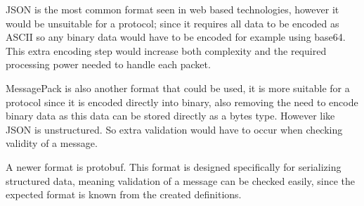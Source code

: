 JSON is the most common format seen in web based technologies, however it would be unsuitable for a protocol; since it requires all data to be encoded as ASCII so any binary data would have to be encoded for example using base64. This extra encoding step would increase both complexity and the required processing power needed to handle each packet.

MessagePack is also another format that could be used, it is more suitable for a protocol since it is encoded directly into binary, also removing the need to encode binary data as this data can be stored directly as a bytes type. However like JSON is unstructured. So extra validation would have to occur when checking validity of a message.

A newer format is protobuf. This format is designed specifically for serializing structured data, meaning validation of a message can be checked easily, since the expected format is known from the created definitions.
